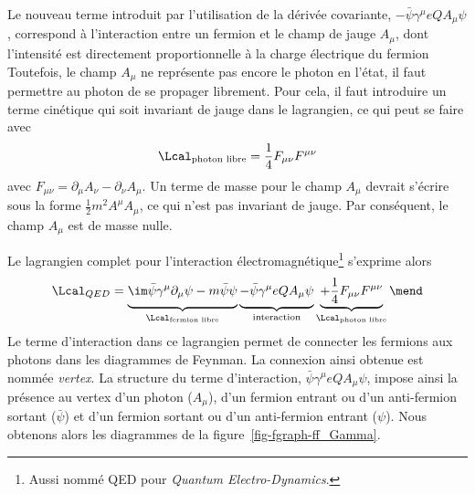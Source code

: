 \par Le nouveau terme introduit par l'utilisation de la dérivée covariante, $- \bar{\psi}\gamma^\mu eQA_\mu \psi$, correspond à l'interaction entre un fermion et le champ de jauge $A_\mu$, dont l'intensité est directement proportionnelle à la charge électrique du fermion
Toutefois, le champ $A_\mu$ ne représente pas encore le photon en l'état, il faut permettre au photon de se propager librement. Pour cela, il faut introduire un terme cinétique qui soit invariant de jauge dans le lagrangien, ce qui peut se faire avec
\begin{equation}
\Lcal_{\text{photon libre}} = \frac{1}{4} F_{\mu\nu}F^{\mu\nu}
\end{equation}
avec $F_{\mu\nu} = \partial_\mu A_\nu - \partial_\nu A_\mu$.
Un terme de masse pour le champ $A_\mu$ devrait s'écrire sous la forme $\frac{1}{2}m^2A^\mu A_\mu$, ce qui n'est pas invariant de jauge. Par conséquent, le champ $A_\mu$ est de masse nulle.
\par Le lagrangien complet pour l'interaction électromagnétique\footnote{Aussi nommé QED pour \emph{Quantum Electro-Dynamics}.} s'exprime alors
\begin{equation}
\Lcal_{QED} =
\underbrace{\im \bar{\psi} \gamma^\mu\partial_\mu \psi - m \bar{\psi}\psi \vphantom{\im \bar{\psi} \gamma^\mu\partial_\mu \psi - m \bar{\psi}\psi - \bar{\psi}\gamma^\mu eQA_\mu \psi + \frac{1}{4} F_{\mu\nu}F^{\mu\nu}}}_{\Lcal_{\text{fermion libre}}}
\underbrace{- \bar{\psi}\gamma^\mu eQA_\mu \psi \vphantom{\im \bar{\psi} \gamma^\mu\partial_\mu \psi - m \bar{\psi}\psi - \bar{\psi}\gamma^\mu eQA_\mu \psi + \frac{1}{4} F_{\mu\nu}F^{\mu\nu}}}_{\text{interaction}}
\underbrace{+ \frac{1}{4} F_{\mu\nu}F^{\mu\nu} \vphantom{\im \bar{\psi} \gamma^\mu\partial_\mu \psi - m \bar{\psi}\psi - \bar{\psi}\gamma^\mu eQA_\mu \psi + \frac{1}{4} F_{\mu\nu}F^{\mu\nu}}}_{\Lcal_{\text{photon libre}}}
\mend
\end{equation}
Le terme d'interaction dans ce lagrangien permet de \og connecter \fg{} les fermions aux photons dans les diagrammes de Feynman.
La \og connexion \fg{} ainsi obtenue est nommée \emph{vertex}.
La structure du terme d'interaction, $\bar{\psi}\gamma^\mu eQA_\mu \psi$, impose ainsi la présence au vertex d'un photon ($A_\mu$), d'un fermion entrant ou d'un anti-fermion sortant ($\bar{\psi}$) et d'un fermion sortant ou d'un anti-fermion entrant ($\psi$). Nous obtenons alors les diagrammes de la figure~\ref{fig-fgraph-ff_Gamma}.
